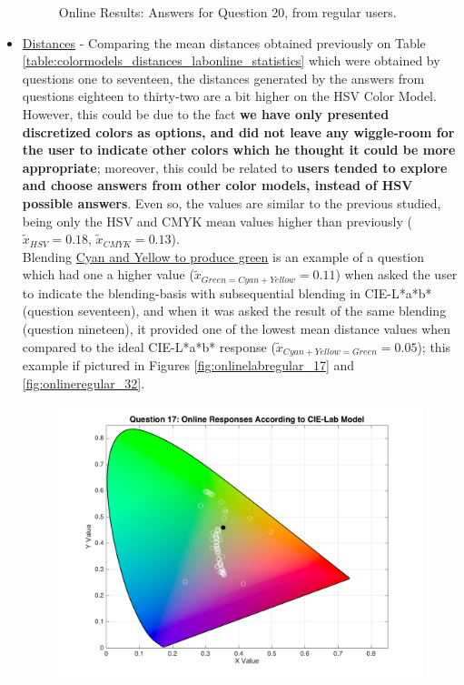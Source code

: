 \begin{itemize}
\begin{figure}[!htbp]
    \caption[Online Results: Answers for Question 20, from regular users.]{Online Results: Answers for Question 20, from regular users.}
    \label{fig:onlineregular_20}
  \end{figure}
  \item \ul{Distances} - Comparing the mean distances obtained previously on Table \ref{table:colormodels_distances_labonline_statistics} which were obtained by questions one to seventeen, the distances generated
  by the answers from questions eighteen to thirty-two are a bit higher on the HSV Color Model. However, this could be due to the fact \textbf{we have only presented discretized colors as options, and did not
  leave any wiggle-room for the user to indicate other colors which he thought it could be more appropriate}; moreover, this could be related to \textbf{users tended to explore and choose answers from other color
  models, instead of HSV possible answers}. Even so, the values are similar to the previous studied, being only the HSV and CMYK mean values higher than previously ($\tilde{x}_{HSV} = 0.18$, $\tilde{x}_{CMYK} = 0.13$).\\
  Blending \ul{Cyan and Yellow to produce green} is an example of a question which had one a higher value ($\tilde{x}_{Green = Cyan + Yellow} = 0.11$) when asked the user to indicate the blending-basis with subsequential
  blending in CIE-L*a*b* (question seventeen), and when it was asked the result of the same blending (question nineteen), it provided one of the lowest mean distance values when compared to the ideal CIE-L*a*b* response
  ($\tilde{x}_{Cyan + Yellow = Green} = 0.05$); this example if pictured in Figures
  \ref{fig:onlinelabregular_17} and \ref{fig:onlineregular_32}.
  \begin{figure}[!htbp]
    \centering
    \begin{minipage}{0.48\textwidth}
      \centering
      \includegraphics[width=\textwidth]{images/17_online_Labresponses.png}

\end{minipage}
\end{figure}
\end{itemize}

